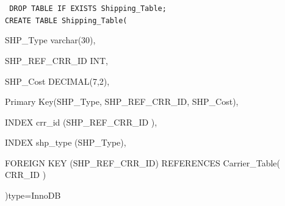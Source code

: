 \documentclass{report}
\begin{document}
        {\tt\small
        DROP TABLE IF EXISTS Shipping\_Table;\\

        CREATE TABLE Shipping\_Table(
        \begin{list}{}
            \item{SHP\_Type                varchar(30),}
            \item{SHP\_REF\_CRR\_ID          INT,}
            \item{SHP\_Cost                DECIMAL(7,2),}
            \item{Primary Key(SHP\_Type, SHP\_REF\_CRR\_ID, SHP\_Cost),}
            \item{INDEX crr\_id (SHP\_REF\_CRR\_ID ),}
            \item{INDEX shp\_type (SHP\_Type),}
            \item{FOREIGN KEY (SHP\_REF\_CRR\_ID) REFERENCES Carrier\_Table( CRR\_ID )}
        \end{list}
        )type=InnoDB\\
        }
\end{document}
